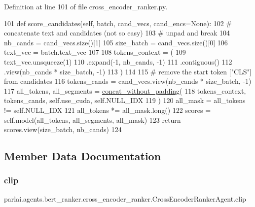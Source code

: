 Definition at line 101 of file cross\+\_\+encoder\+\_\+ranker.\+py.


\begin{DoxyCode}
101     \textcolor{keyword}{def }score\_candidates(self, batch, cand\_vecs, cand\_encs=None):
102         \textcolor{comment}{# concatenate text and candidates (not so easy)}
103         \textcolor{comment}{# unpad and break}
104         nb\_cands = cand\_vecs.size()[1]
105         size\_batch = cand\_vecs.size()[0]
106         text\_vec = batch.text\_vec
107 
108         tokens\_context = (
109             text\_vec.unsqueeze(1)
110             .expand(-1, nb\_cands, -1)
111             .contiguous()
112             .view(nb\_cands * size\_batch, -1)
113         )
114 
115         \textcolor{comment}{# remove the start token ["CLS"] from candidates}
116         tokens\_cands = cand\_vecs.view(nb\_cands * size\_batch, -1)
117         all\_tokens, all\_segments = \hyperlink{namespaceparlai_1_1agents_1_1bert__ranker_1_1cross__encoder__ranker_a3914765cd62574f6f077c6e2e0070ab4}{concat\_without\_padding}(
118             tokens\_context, tokens\_cands, self.use\_cuda, self.NULL\_IDX
119         )
120         all\_mask = all\_tokens != self.NULL\_IDX
121         all\_tokens *= all\_mask.long()
122         scores = self.model(all\_tokens, all\_segments, all\_mask)
123         \textcolor{keywordflow}{return} scores.view(size\_batch, nb\_cands)
124 
\end{DoxyCode}


\subsection{Member Data Documentation}
\mbox{\label{classparlai_1_1agents_1_1bert__ranker_1_1cross__encoder__ranker_1_1CrossEncoderRankerAgent_a07990f2aca9e4da9d38ab8b70830a48f}} 
\subsubsection{\texorpdfstring{clip}{clip}}
{\footnotesize\ttfamily parlai.\+agents.\+bert\+\_\+ranker.\+cross\+\_\+encoder\+\_\+ranker.\+Cross\+Encoder\+Ranker\+Agent.\+clip}



